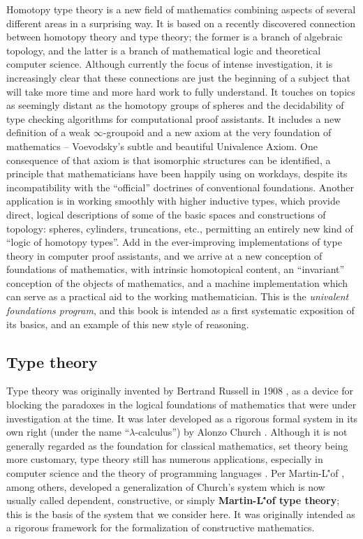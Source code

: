 {Homotopy type theory is a new field of mathematics combining aspects of several different areas in a surprising way.  It is based on a recently discovered connection between homotopy theory and type theory; the former is a branch of algebraic topology, and the latter is a branch of mathematical logic and theoretical computer science.  Although currently the focus of intense investigation, it is increasingly clear that these connections are just the beginning of a subject that will take more time and more hard work to fully understand.  It touches on topics as seemingly distant as the homotopy groups of  spheres and the decidability of type checking algorithms for computational proof assistants.  It includes a new definition of a weak $\infty$-groupoid and a new axiom at the very foundation of mathematics -- Voevodsky's subtle and beautiful Univalence Axiom.  One consequence of that axiom is that isomorphic structures can be identified, a principle that mathematicians have been happily using on workdays, despite its incompatibility with the ``official'' doctrines of conventional foundations.  Another application is in working smoothly with higher inductive types, which provide direct, logical descriptions of some of the basic spaces and constructions of topology: spheres, cylinders, truncations, etc., permitting an entirely new kind of ``logic of homotopy types''.   Add in the ever-improving  implementations of type theory in computer proof assistants, and we arrive at a new conception of foundations of mathematics, with intrinsic homotopical content, an ``invariant'' conception of the objects of mathematics, and a machine implementation which can serve as a practical aid to the working mathematician.  This is the \emph{univalent foundations program}, and this book is intended as a first systematic exposition of its basics, and an example of this new style of reasoning. 


\subsection*{Type theory}

Type theory was originally invented by Bertrand Russell in 1908 \cite{Russell:1908}, as a device for blocking the paradoxes in the logical foundations of mathematics  that were under investigation at the time. It was later developed as a rigorous formal system  in its own right (under the name ``$\lambda$-calculus'') by Alonzo Church \cite{Church:1933cl,Church:1940tu,Church:1941tc}.  Although it is not generally regarded as the foundation for classical mathematics, set theory being more customary, type theory still has numerous applications, especially in computer science and the theory of programming languages \cite{Pierce:2002tp}.   Per Martin-L\''{o}f \cite{MartinLof:1998tw,MartinLof:1975tb,MartinLof:1982bn,MartinLof:1984tr}, among others,
developed a generalization of Church's system which is now usually called dependent, constructive, or simply {\bf Martin\--L\''of type theory}; this is the basis of the system that we consider here. It was originally intended as a rigorous framework for the formalization of constructive mathematics.  

}
